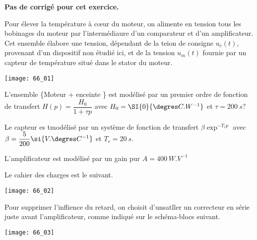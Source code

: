 \normaltrue \difficilefalse \tdifficilefalse
\correctionfalse

\setcounter{numques}{0}


\ifcorrection
\else
\textbf{Pas de corrigé pour cet exercice.}
\fi

Pour élever la température à c\oe{}ur du moteur, on alimente en tension tous les bobinages du moteur par l'intermédiaure d'un comparateur et d'un amplificateur. Cet ensemble élabore une tension, dépendant de la teion de consigne $u_c(t)$, provenant d'un dispositif non étudié ici, et de la tension $u_m(t)$ fournie par un capteur de température situé dans le stator du moteur. 

\begin{center}
\texttt{[image: 66\_01]}
\end{center}


L'ensemble \{Moteur + enceinte \} est modélisé par un premier ordre de fonction de transfert $H(p)=\dfrac{H_0}{1+\tau p}$
avec $H_0 = \SI{0}{\degres C.W^{-1}}$ et $\tau=\SI{200}{s}$?

Le capteur es tmodélisé par un système de fonction de transfert $\beta \exp^{-T_r p}$ avec $\beta = \dfrac{5}{200}\si{V.\degres C^{-1}}$ et $T_r = \SI{20}{s}$.

L'amplificateur est modélisé par un gain pur $A= \SI{400}{W.V^{-1}}$

Le cahier des charges est le suivant. 

\begin{center}
\texttt{[image: 66\_02]}
\end{center}

\ifprof
\else 
\fi

Pour supprimer l'inflience du retard, on choisit d'unsatller un correcteur en série juste avant l'amplificateur, comme indiqué sur le schéma-blocs suivant. 

\begin{center}
\texttt{[image: 66\_03]}
\end{center}

\ifprof
\else 
\fi

